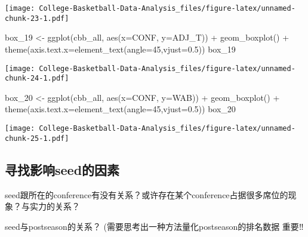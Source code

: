 \documentclass[
]{article}
\newenvironment{Shaded}{\begin{snugshade}}{\end{snugshade}}
\newcommand{\AttributeTok}[1]{\textcolor[rgb]{0.77,0.63,0.00}{#1}}
\newcommand{\DecValTok}[1]{\textcolor[rgb]{0.00,0.00,0.81}{#1}}
\newcommand{\FloatTok}[1]{\textcolor[rgb]{0.00,0.00,0.81}{#1}}
\newcommand{\FunctionTok}[1]{\textcolor[rgb]{0.00,0.00,0.00}{#1}}
\newcommand{\NormalTok}[1]{#1}
\newcommand{\OtherTok}[1]{\textcolor[rgb]{0.56,0.35,0.01}{#1}}
\newcommand{\SpecialCharTok}[1]{\textcolor[rgb]{0.00,0.00,0.00}{#1}}
\begin{document}
\texttt{[image: College-Basketball-Data-Analysis\_files/figure-latex/unnamed-chunk-23-1.pdf]}

\begin{Shaded}
\begin{Highlighting}[]
\NormalTok{box\_19 }\OtherTok{\textless{}{-}} \FunctionTok{ggplot}\NormalTok{(cbb\_all, }\FunctionTok{aes}\NormalTok{(}\AttributeTok{x=}\NormalTok{CONF, }\AttributeTok{y=}\NormalTok{ADJ\_T)) }\SpecialCharTok{+} \FunctionTok{geom\_boxplot}\NormalTok{() }\SpecialCharTok{+} \FunctionTok{theme}\NormalTok{(}\AttributeTok{axis.text.x=}\FunctionTok{element\_text}\NormalTok{(}\AttributeTok{angle=}\DecValTok{45}\NormalTok{,}\AttributeTok{vjust=}\FloatTok{0.5}\NormalTok{))}
\NormalTok{box\_19}
\end{Highlighting}
\end{Shaded}

\texttt{[image: College-Basketball-Data-Analysis\_files/figure-latex/unnamed-chunk-24-1.pdf]}

\begin{Shaded}
\begin{Highlighting}[]
\NormalTok{box\_20 }\OtherTok{\textless{}{-}} \FunctionTok{ggplot}\NormalTok{(cbb\_all, }\FunctionTok{aes}\NormalTok{(}\AttributeTok{x=}\NormalTok{CONF, }\AttributeTok{y=}\NormalTok{WAB)) }\SpecialCharTok{+} \FunctionTok{geom\_boxplot}\NormalTok{() }\SpecialCharTok{+} \FunctionTok{theme}\NormalTok{(}\AttributeTok{axis.text.x=}\FunctionTok{element\_text}\NormalTok{(}\AttributeTok{angle=}\DecValTok{45}\NormalTok{,}\AttributeTok{vjust=}\FloatTok{0.5}\NormalTok{))}
\NormalTok{box\_20}
\end{Highlighting}
\end{Shaded}

\texttt{[image: College-Basketball-Data-Analysis\_files/figure-latex/unnamed-chunk-25-1.pdf]}

\hypertarget{ux5bfbux627eux5f71ux54cdseedux7684ux56e0ux7d20}{%
\subsection{寻找影响seed的因素}\label{ux5bfbux627eux5f71ux54cdseedux7684ux56e0ux7d20}}

seed跟所在的conference有没有关系？或许存在某个conference占据很多席位的现象？与实力的关系？

seed与postseason的关系？ (需要思考出一种方法量化postseason的排名数据
重要‼️
\end{document}
